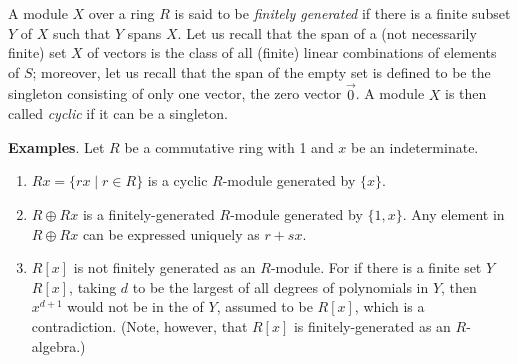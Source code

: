 \documentclass[12pt]{article}
\begin{document}
A module $X$ over a ring $R$ is said to be {\em finitely generated} if there is a finite subset $Y$ of $X$ such that $Y$ spans $X$. Let us recall that the span of a (not necessarily finite) set $X$  of vectors is the class of all (finite) linear combinations of elements of $S$; moreover, let us recall that the span of the empty set is defined to be the singleton consisting of only one vector, the zero vector $\vec{0}$. A module $X$ is then called \emph{cyclic} if it can be  a singleton. 
\par
\textbf{Examples}.  Let $R$ be a commutative ring with 1 and $x$ be an indeterminate.
\begin{enumerate}
\item $Rx=\lbrace rx \mid r\in R \rbrace$ is a cyclic $R$-module generated by $\lbrace x \rbrace$.
\item $R\oplus Rx$ is a finitely-generated $R$-module generated by $\lbrace 1, x \rbrace$.  Any element in $R\oplus Rx$ 
can be expressed uniquely as $r+sx$.
\item $R[x]$ is not finitely generated as an $R$-module.  For if there is a finite set $Y$  $R[x]$, taking $d$ to be the largest of all degrees of polynomials in $Y$, then $x^{d+1}$ would not be in the  of $Y$, assumed to be $R[x]$, which is a contradiction.  (Note, however, that $R[x]$ is finitely-generated as an $R$-algebra.)
\end{enumerate}
\end{document}
